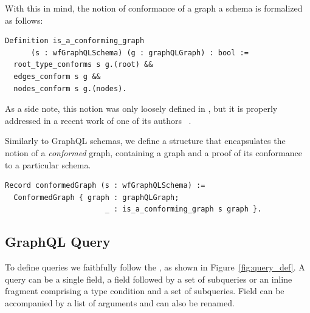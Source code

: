 With this in mind, the notion of conformance of a graph \wrt a schema is formalized as follows:
%
\begin{verbatim}
Definition is_a_conforming_graph 
      (s : wfGraphQLSchema) (g : graphQLGraph) : bool :=
  root_type_conforms s g.(root) &&
  edges_conform s g &&
  nodes_conform s g.(nodes).
\end{verbatim}
%
As a side note, this notion was only loosely defined in \HP, but it is properly addressed in a recent work of one of its authors ~\cite{olafschema}.

Similarly to GraphQL schemas, we define a structure that encapsulates the notion of a \textit{conformed} graph, containing a graph and a proof of its conformance to a particular schema.

\begin{verbatim}
Record conformedGraph (s : wfGraphQLSchema) :=
  ConformedGraph { graph : graphQLGraph;
                       _ : is_a_conforming_graph s graph }.
\end{verbatim}




\subsection{GraphQL Query}\label{subsec:query}
To define queries we faithfully follow the \spec, as shown in Figure~\ref{fig:query_def}. A query can be a single field, a field followed by a set of subqueries or an inline fragment comprising a type condition and a set of subqueries. Field can be accompanied by a list of arguments and can also be renamed.

